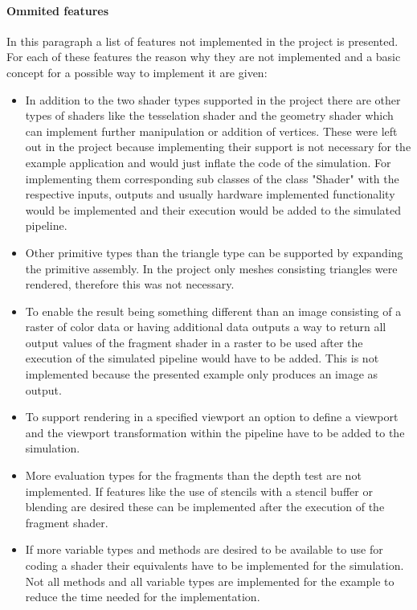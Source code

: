 \paragraph{Ommited features}

In this paragraph a list of features not implemented in the project is presented. For each of these features the reason why they are not implemented and a basic concept for a possible way to implement it are given:

\begin{itemize}
\item In addition to the two shader types supported in the project there are other types of shaders like the tesselation shader and the geometry shader which can implement further manipulation or addition of vertices. These were left out in the project because implementing their support is not necessary for the example application and would just inflate the code of the simulation. For implementing them corresponding sub classes of the class "Shader" with the respective inputs, outputs and usually hardware implemented functionality would be implemented and their execution would be added to the simulated pipeline.
\item Other primitive types than the triangle type can be supported by expanding the primitive assembly. In the project only meshes consisting triangles were rendered, therefore this was not necessary.
\item To enable the result being something different than an image consisting of a raster of color data or having additional data outputs a way to return all output values of the fragment shader in a raster to be used after the execution of the simulated pipeline would have to be added. This is not implemented because the presented example only produces an image as output.
\item To support rendering in a specified viewport an option to define a viewport and the viewport transformation within the pipeline have to be added to the simulation.
\item More evaluation types for the fragments than the depth test are not implemented. If features like the use of stencils with a stencil buffer or blending are desired these can be implemented after the execution of the fragment shader.
\item If more variable types and methods are desired to be available to use for coding a shader their equivalents have to be implemented for the simulation. Not all methods and all variable types are implemented for the example to reduce the time needed for the implementation.
\end{itemize}

